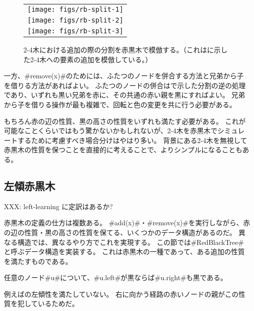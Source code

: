 \begin{figure}
  \begin{center}
   \begin{tabular}{c}
     \texttt{[image: figs/rb-split-1]} \\
     \texttt{[image: figs/rb-split-2]} \\
     \texttt{[image: figs/rb-split-3]} \\
   \end{tabular}
  \end{center}
  \caption{2-4木における追加の際の分割を赤黒木で模倣する。（これはに示した2-4木への要素の追加を模倣している。）}
\end{figure}

一方、#remove(x)#のためには、ふたつのノードを併合する方法と兄弟から子を借りる方法があればよい。
ふたつのノードの併合はで示した分割の逆の処理であり、いずれも黒い兄弟を赤に、その共通の赤い親を黒にすればよい。
兄弟から子を借りる操作が最も複雑で、回転と色の変更を共に行う必要がある。

もちろん赤の辺の性質、黒の高さの性質をいずれも満たす必要がある。
これが可能なことくらいではもう驚かないかもしれないが、2-4木を赤黒木でシミュレートするために考慮すべき場合分けはやはり多い。
背景にある2-4木を無視して赤黒木の性質を保つことを直接的に考えることで、よりシンプルになることもある。

\subsection{左傾赤黒木}
XXX: left-learning に定訳はあるか? %

%
%
赤黒木の定義の仕方は複数ある。
#add(x)#・#remove(x)#を実行しながら、赤の辺の性質・黒の高さの性質を保てる、いくつかのデータ構造があるのだ。
異なる構造では、異なるやり方でこれを実現する。
この節では#RedBlackTree#と呼ぶデータ構造を実装する。
%
これは赤黒木の一種であって、ある追加の性質を満たすものである。
\begin{prp}[左傾性]
  任意のノード#u#について、#u.left#が黒ならば#u.right#も黒である。
\end{prp}
例えばの左傾性を満たしていない。
右に向かう経路の赤いノードの親がこの性質を犯しているためだ。

